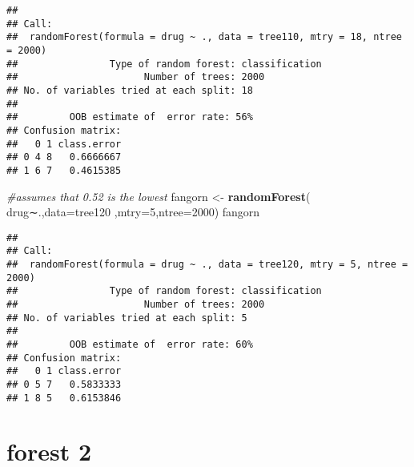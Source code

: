 \documentclass[]{article}
\newenvironment{Shaded}{\begin{snugshade}}{\end{snugshade}}
\newcommand{\KeywordTok}[1]{\textcolor[rgb]{0.13,0.29,0.53}{\textbf{#1}}}
\newcommand{\DataTypeTok}[1]{\textcolor[rgb]{0.13,0.29,0.53}{#1}}
\newcommand{\DecValTok}[1]{\textcolor[rgb]{0.00,0.00,0.81}{#1}}
\newcommand{\StringTok}[1]{\textcolor[rgb]{0.31,0.60,0.02}{#1}}
\newcommand{\CommentTok}[1]{\textcolor[rgb]{0.56,0.35,0.01}{\textit{#1}}}
\newcommand{\OperatorTok}[1]{\textcolor[rgb]{0.81,0.36,0.00}{\textbf{#1}}}
\newcommand{\NormalTok}[1]{#1}
\begin{document}
\begin{verbatim}
## 
## Call:
##  randomForest(formula = drug ~ ., data = tree110, mtry = 18, ntree = 2000) 
##                Type of random forest: classification
##                      Number of trees: 2000
## No. of variables tried at each split: 18
## 
##         OOB estimate of  error rate: 56%
## Confusion matrix:
##   0 1 class.error
## 0 4 8   0.6666667
## 1 6 7   0.4615385
\end{verbatim}

\begin{Shaded}
\begin{Highlighting}[]
\CommentTok{#assumes that 0.52 is the lowest }
\NormalTok{fangorn <-}\StringTok{ }\KeywordTok{randomForest}\NormalTok{( drug∼.,}\DataTypeTok{data=}\NormalTok{tree120  ,}\DataTypeTok{mtry=}\DecValTok{5}\NormalTok{,}\DataTypeTok{ntree=}\DecValTok{2000}\NormalTok{)}
\NormalTok{fangorn}
\end{Highlighting}
\end{Shaded}

\begin{verbatim}
## 
## Call:
##  randomForest(formula = drug ~ ., data = tree120, mtry = 5, ntree = 2000) 
##                Type of random forest: classification
##                      Number of trees: 2000
## No. of variables tried at each split: 5
## 
##         OOB estimate of  error rate: 60%
## Confusion matrix:
##   0 1 class.error
## 0 5 7   0.5833333
## 1 8 5   0.6153846
\end{verbatim}

\section{forest 2}\label{forest-2}

\begin{Shaded}
\end{Shaded}
\end{document}
